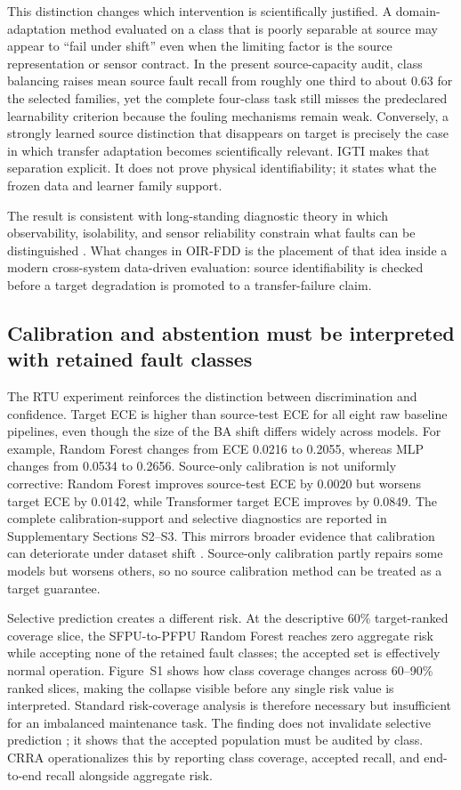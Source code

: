 \documentclass[preprint,12pt]{elsarticle}
\begin{document}
This distinction changes which intervention is scientifically justified. A domain-adaptation method evaluated on a class that is poorly separable at source may appear to ``fail under shift'' even when the limiting factor is the source representation or sensor contract. In the present source-capacity audit, class balancing raises mean source fault recall from roughly one third to about 0.63 for the selected families, yet the complete four-class task still misses the predeclared learnability criterion because the fouling mechanisms remain weak. Conversely, a strongly learned source distinction that disappears on target is precisely the case in which transfer adaptation becomes scientifically relevant. IGTI makes that separation explicit. It does not prove physical identifiability; it states what the frozen data and learner family support.

The result is consistent with long-standing diagnostic theory in which observability, isolability, and sensor reliability constrain what faults can be distinguished \cite{bhushan2000,yang2009}. What changes in OIR-FDD is the placement of that idea inside a modern cross-system data-driven evaluation: source identifiability is checked before a target degradation is promoted to a transfer-failure claim.

\subsection{Calibration and abstention must be interpreted with retained fault classes}
The RTU experiment reinforces the distinction between discrimination and confidence. Target ECE is higher than source-test ECE for all eight raw baseline pipelines, even though the size of the BA shift differs widely across models. For example, Random Forest changes from ECE 0.0216 to 0.2055, whereas MLP changes from 0.0534 to 0.2656. Source-only calibration is not uniformly corrective: Random Forest improves source-test ECE by 0.0020 but worsens target ECE by 0.0142, while Transformer target ECE improves by 0.0849. The complete calibration-support and selective diagnostics are reported in Supplementary Sections S2--S3. This mirrors broader evidence that calibration can deteriorate under dataset shift \cite{ovadia2019uncertainty,liang2023uq}. Source-only calibration partly repairs some models but worsens others, so no source calibration method can be treated as a target guarantee.

Selective prediction creates a different risk. At the descriptive 60\% target-ranked coverage slice, the SFPU-to-PFPU Random Forest reaches zero aggregate risk while accepting none of the retained fault classes; the accepted set is effectively normal operation. Figure~S1 shows how class coverage changes across 60--90\% ranked slices, making the collapse visible before any single risk value is interpreted. Standard risk-coverage analysis is therefore necessary but insufficient for an imbalanced maintenance task. The finding does not invalidate selective prediction \cite{geifman2017selective,geifman2019selectivenet}; it shows that the accepted population must be audited by class. CRRA operationalizes this by reporting class coverage, accepted recall, and end-to-end recall alongside aggregate risk.
\end{document}
